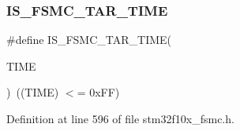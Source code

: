 \subsubsection{\texorpdfstring{I\+S\+\_\+\+F\+S\+M\+C\+\_\+\+T\+A\+R\+\_\+\+T\+I\+ME}{IS\_FSMC\_TAR\_TIME}}
{\footnotesize\ttfamily \#define I\+S\+\_\+\+F\+S\+M\+C\+\_\+\+T\+A\+R\+\_\+\+T\+I\+ME(\begin{DoxyParamCaption}\item[{}]{T\+I\+ME }\end{DoxyParamCaption})~((T\+I\+ME) $<$= 0x\+F\+F)}



Definition at line 596 of file stm32f10x\+\_\+fsmc.\+h.

